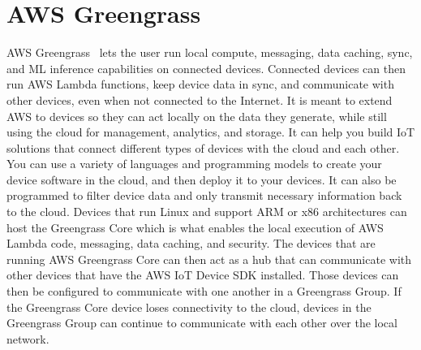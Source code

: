 \section{AWS Greengrass}
AWS Greengrass~\cite{hid-sp18-521-Greengrass} lets the user run local compute, 
messaging, data caching, sync, and ML inference capabilities on connected
devices. Connected devices can then run AWS Lambda functions, keep device 
data in sync, and communicate with other devices, even when not connected
to the Internet. It is meant to extend AWS to devices so they can act 
locally on the data they generate, while still using the cloud for 
management, analytics, and storage. It can help you build IoT solutions 
that connect different types of devices with the cloud and each other. 
You can use a variety of languages and programming models to create your 
device software in the cloud, and then deploy it to your devices. It can 
also be programmed to filter device data and only transmit necessary 
information back to the cloud. Devices that run Linux and support ARM or 
x86 architectures can host the Greengrass Core which is what enables the
local execution of AWS Lambda code, messaging, data caching, and security.
The devices that are running AWS Greengrass Core can then act as a hub that 
can communicate with other devices that have the AWS IoT Device SDK 
installed. Those devices can then be configured to communicate with one 
another in a Greengrass Group. If the Greengrass Core device loses 
connectivity to the cloud, devices in the Greengrass Group can continue 
to communicate with each other over the local network. 
